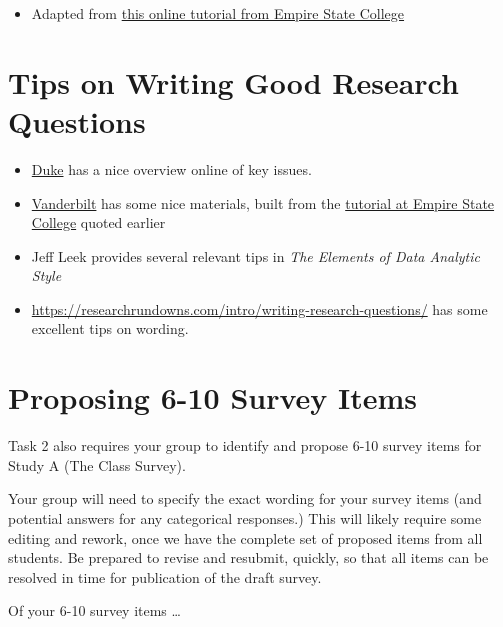 \documentclass[]{book}
\providecommand{\tightlist}{%
  \setlength{\itemsep}{0pt}\setlength{\parskip}{0pt}}
\begin{document}
\begin{itemize}
\tightlist
\item
  Adapted from \href{http://www8.esc.edu/htmlpages/writerold/menus.htm\#develop}{this online tutorial from Empire State College}
\end{itemize}

\hypertarget{tips-on-writing-good-research-questions}{%
\section{Tips on Writing Good Research Questions}\label{tips-on-writing-good-research-questions}}

\begin{itemize}
\tightlist
\item
  \href{https://sites.duke.edu/urgws/files/2014/02/Research-Questions_WS-handout.pdf}{Duke} has a nice overview online of key issues.
\item
  \href{https://www.vanderbilt.edu/writing/wp-content/uploads/sites/164/2016/10/Formulating-Your-Research-Question.pdf}{Vanderbilt} has some nice materials, built from the \href{http://www8.esc.edu/htmlpages/writerold/menus.htm\#develop}{tutorial at Empire State College} quoted earlier
\item
  Jeff Leek provides several relevant tips in \emph{The Elements of Data Analytic Style}
\item
  \url{https://researchrundowns.com/intro/writing-research-questions/} has some excellent tips on wording.
\end{itemize}

\hypertarget{proposing-6-10-survey-items}{%
\section{Proposing 6-10 Survey Items}\label{proposing-6-10-survey-items}}

Task 2 also requires your group to identify and propose 6-10 survey items for Study A (The Class Survey).

Your group will need to specify the exact wording for your survey items (and potential answers for any categorical responses.) This will likely require some editing and rework, once we have the complete set of proposed items from all students. Be prepared to revise and resubmit, quickly, so that all items can be resolved in time for publication of the draft survey.

Of your 6-10 survey items \ldots{}
\end{document}

